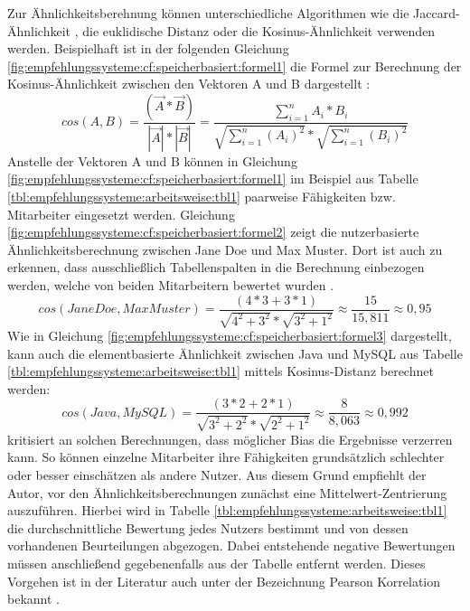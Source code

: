 Zur Ähnlichkeitsberehnung können unterschiedliche Algorithmen wie die Jaccard-Ähnlichkeit \cite[S. 2]{bharti:2019}, die euklidische Distanz \cite[S. 3]{cheng:2013} oder die Kosinus-Ähnlichkeit \cite[S. 2]{duong:2018} verwenden werden. Beispielhaft ist in der folgenden Gleichung \ref{fig:empfehlungssysteme:cf:speicherbasiert:formel1} die Formel zur Berechnung der Kosinus-Ähnlichkeit zwischen den Vektoren A und B dargestellt \cite[S. 111]{bharti:2019}:
\begin{equation}
cos(A,B) = \frac{(\vec{A} * \vec{B})}{|\vec{A}| * |\vec{B}|} = \frac{\sum_{i=1}^n A_i * B_i}{\sqrt{\sum_{i=1}^n (A_i)^2} * \sqrt{\sum_{i=1}^n (B_i)^2}}
\label{fig:empfehlungssysteme:cf:speicherbasiert:formel1}
\end{equation}
Anstelle der Vektoren A und B können in Gleichung \ref{fig:empfehlungssysteme:cf:speicherbasiert:formel1} im Beispiel aus Tabelle \ref{tbl:empfehlungssysteme:arbeitsweise:tbl1} paarweise Fähigkeiten bzw. Mitarbeiter eingesetzt werden. Gleichung \ref{fig:empfehlungssysteme:cf:speicherbasiert:formel2} zeigt die nutzerbasierte Ähnlichkeitsberechnung zwischen Jane Doe und Max Muster. Dort ist auch zu erkennen, dass ausschließlich Tabellenspalten in die Berechnung einbezogen werden, welche von beiden Mitarbeitern bewertet wurden \cite[S. 2f.]{hao:2013}.
\begin{equation}
	cos(Jane Doe,Max Muster) = \frac{(4*3 + 3*1)}{\sqrt{4^2 + 3^2} * \sqrt{3^2 + 1^2}} \approx \frac{15}{15,811} \approx 0,95
	\label{fig:empfehlungssysteme:cf:speicherbasiert:formel2}
\end{equation}
Wie in Gleichung \ref{fig:empfehlungssysteme:cf:speicherbasiert:formel3} dargestellt, kann auch die elementbasierte Ähnlichkeit zwischen Java und MySQL aus Tabelle \ref{tbl:empfehlungssysteme:arbeitsweise:tbl1} mittels Kosinus-Distanz berechnet werden:
\begin{equation}
	cos(Java, MySQL) = \frac{(3*2 + 2*1)}{\sqrt{3^2 + 2^2} * \sqrt{2^2 + 1^2}} \approx \frac{8}{8,063} \approx 0,992
	\label{fig:empfehlungssysteme:cf:speicherbasiert:formel3}
\end{equation}
\textcite[S. 35ff.]{recommenderSystems:2016} kritisiert an solchen Berechnungen, dass möglicher Bias die Ergebnisse verzerren kann. So können einzelne Mitarbeiter ihre Fähigkeiten grundsätzlich schlechter oder besser einschätzen als andere Nutzer. Aus diesem Grund empfiehlt der Autor, vor den Ähnlichkeitsberechnungen zunächst eine Mittelwert-Zentrierung auszuführen. Hierbei wird in Tabelle \ref{tbl:empfehlungssysteme:arbeitsweise:tbl1} die durchschnittliche Bewertung jedes Nutzers bestimmt und von dessen vorhandenen Beurteilungen abgezogen. Dabei entstehende negative Bewertungen müssen anschließend gegebenenfalls aus der Tabelle entfernt werden. Dieses Vorgehen ist in der Literatur auch unter der Bezeichnung Pearson Korrelation bekannt \cite[S. 3]{bharti:2019}.

